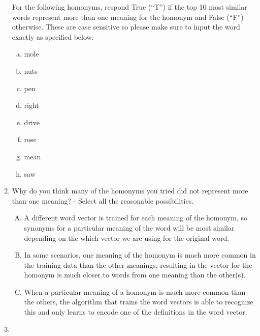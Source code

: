 \begin{enumerate}[1.]
For the following homonyms, respond True (``T'') if the top 10 most similar words represent more than one meaning for the homonym and False (``F'') otherwise. These are case sensitive so please make sure to input the word exactly as specified below:

\begin{enumerate}[a.]
\item mole
\item nuts
\item pen
\item right
\item drive
\item rose
\item mean
\item saw
\end{enumerate}


\item {}

Why do you think many of the homonyms you tried did not represent more than one meaning? - Select all the reasonable possibilities.

\begin{enumerate}[A)]
\item A different word vector is trained for each meaning of the homonym, so synonyms for a particular meaning of the word will be most similar depending on the which vector we are using for the original word.

\item In some scenarios, one meaning of the homonym is much more common in the training data than the other meanings, resulting in the vector for the homonym is much closer to words from one meaning than the other(s).

\item When a particular meaning of a homonym is much more common than the others, the algorithm that trains the word vectors is able to recognize this and only learns to encode one of the definitions in the word vector.
\end{enumerate}


\item {}


\end{enumerate}
